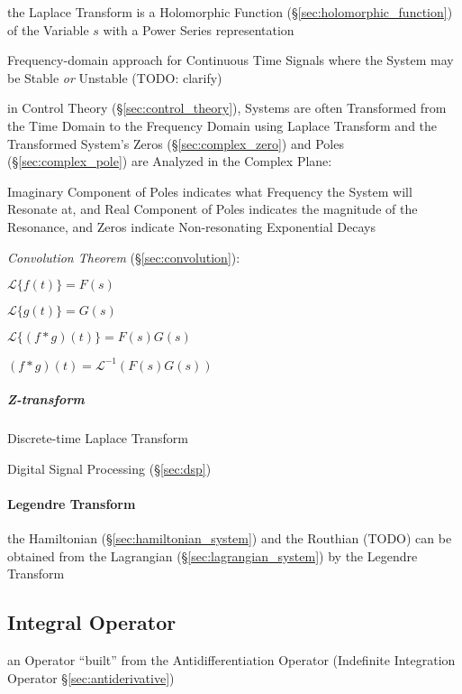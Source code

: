 the Laplace Transform is a Holomorphic Function
(\S\ref{sec:holomorphic_function}) of the Variable $s$ with a Power Series
representation

Frequency-domain approach for Continuous Time Signals where the System may be
Stable \emph{or} Unstable (TODO: clarify)

in Control Theory (\S\ref{sec:control_theory}), Systems are often Transformed
from the Time Domain to the Frequency Domain using Laplace Transform and the
Transformed System's Zeros (\S\ref{sec:complex_zero}) and Poles
(\S\ref{sec:complex_pole}) are Analyzed in the Complex Plane:

Imaginary Component of Poles indicates what Frequency the System will Resonate
at, and Real Component of Poles indicates the magnitude of the Resonance, and
Zeros indicate Non-resonating Exponential Decays


\emph{Convolution Theorem} (\S\ref{sec:convolution}):

$\mathcal{L}\{f(t)\} = F(s)$

$\mathcal{L}\{g(t)\} = G(s)$

$\mathcal{L}\{(f * g)(t)\} = F(s)G(s)$

$(f*g)(t) = \mathcal{L}^{-1}(F(s)G(s))$



\subparagraph{Z-transform}\label{sec:z_transform}

Discrete-time Laplace Transform

Digital Signal Processing (\S\ref{sec:dsp})



\paragraph{Legendre Transform}\label{sec:legendre_transform}\hfill

the Hamiltonian (\S\ref{sec:hamiltonian_system}) and the Routhian (TODO) can be
obtained from the Lagrangian (\S\ref{sec:lagrangian_system}) by the Legendre
Transform



\subsection{Integral Operator}\label{sec:integral_operator}

an Operator ``built'' from the Antidifferentiation Operator (Indefinite
Integration Operator \S\ref{sec:antiderivative})

